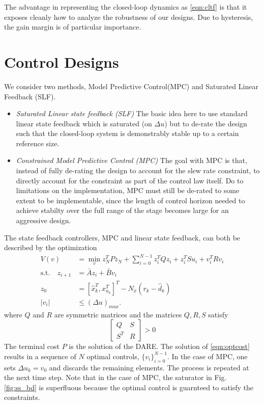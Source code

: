 \documentclass[journal,twocolumn,twoside]{IEEEtran}
\newcommand{\Ad}{\ensuremath{\bar A }\xspace}
\newcommand{\Bd}{\ensuremath{\bar B }\xspace}
\begin{document}
The advantage in representing the closed-loop dynamics as \eqref{eqn:cltf} is that it exposes cleanly how to analyze the robustness of our designs. Due to hysteresis, the gain margin is of particular importance. 


%   


\section{Control Designs}
We consider two methods, Model Predictive Control(MPC) and Saturated Linear Feedback (SLF).
\begin{itemize}
\item\emph{Saturated Linear state feedback (SLF)} The basic idea here to use standard linear state feedback which is saturated (on $\Delta u$) but to de-rate the design such that the closed-loop system is demonstrably stable up to a certain reference size. 
\item\emph{Constrained Model Predictive Control (MPC)} The goal with MPC is that, instead of fully de-rating the design to account for the slew rate constraint, to directly account for the constraint as part of the control law itself. Do to limitations on the implementation, MPC must still be de-rated to some extent to be implementable, since the length of control horizon needed to achieve stabilty over the full range of the stage becomes large for an aggressive design.
\end{itemize}

The state feedback controllers, MPC and linear state feedback, can both be described by the optimization
\begin{align}
V(v) &= \min_{v} z^T_{N}Pz_{N} + \sum_{i=0}^{N-1}z_{i}^{T}Qz_{i} + z^T_iSu_i + v^{T}_{i}Rv_{i} \label{eqn:optcost}\\
 \text{s.t.} \quad z_{i+1} &= \Ad z_{i} + \Bd v_{i}\\
z_{0} &= [\hat{x}^T_{k}, x^T_{u_k}]^T - N_{\bar{x}}(r_k-\hat{d}_k)\\
|v_i | & \leq (\Delta u)_{max}.\label{eqn:cntrl_constraint}
\end{align}
where $Q$ and $R$ are symmetric matrices and the matrices $Q,R,S$ satisfy
\begin{equation}
  \begin{bmatrix}
    Q & S\\S^T &R
  \end{bmatrix} > 0
\end{equation}
The terminal cost $P$ is the solution of the DARE. The solution of \eqref{eqn:optcost} results in a sequence of $N$ optimal controls, $\{v_i\}_{i=0}^{N-1}$. In the case of MPC, one sets $\Delta u_k = v_0$ and discards the remaining elements. The process is repeated at the next time step. Note that in the case of MPC, the saturator in Fig. \ref{fig:ss_bd} is superfluous because the optimal control is guarnteed to satisfy the constraints.
\end{document}
